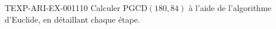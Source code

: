 \begin{exercice}{TEXP-ARI-EX-001}{1}{10}
Calculer $\mathrm{PGCD}(180,84)$ à l'aide de l'algorithme d'Euclide, en détaillant chaque étape.
\end{exercice}
